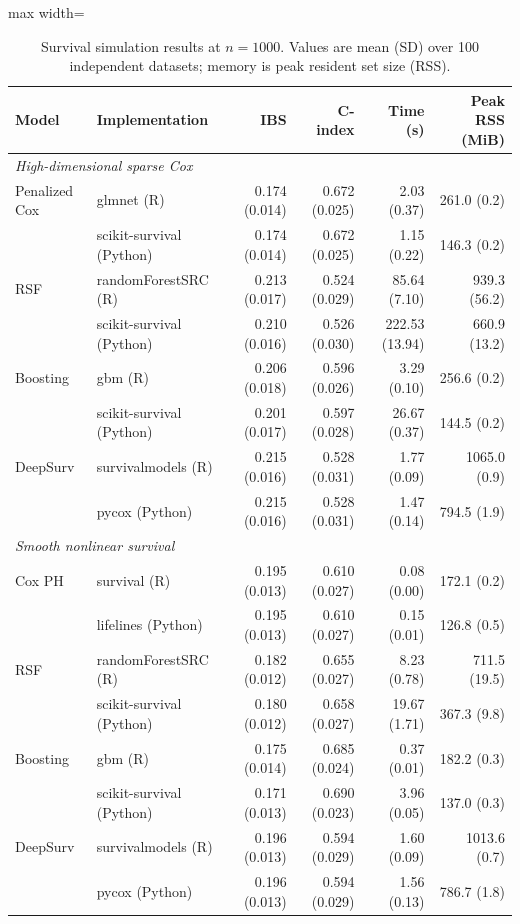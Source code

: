 \begin{table}[htbp]
\centering
\small
\caption{Survival simulation results at $n=1000$. Values are mean (SD) over 100 independent datasets; memory is peak resident set size (RSS).}
\label{tab:survival_simulation_results_n1000}
\setlength{\tabcolsep}{3pt}
\renewcommand{\arraystretch}{1.1}
\begin{adjustbox}{max width=\linewidth}
\begin{tabular}{llrrrr}
\toprule
Model & Implementation & IBS & C-index & Time (s) & Peak RSS (MiB) \\
\midrule
\multicolumn{6}{l}{\textit{High-dimensional sparse Cox}}\\
Penalized Cox & glmnet (R) & 0.174 (0.014) & 0.672 (0.025) & 2.03 (0.37) & 261.0 (0.2) \\
 & scikit-survival (Python) & 0.174 (0.014) & 0.672 (0.025) & 1.15 (0.22) & 146.3 (0.2) \\
RSF & randomForestSRC (R) & 0.213 (0.017) & 0.524 (0.029) & 85.64 (7.10) & 939.3 (56.2) \\
 & scikit-survival (Python) & 0.210 (0.016) & 0.526 (0.030) & 222.53 (13.94) & 660.9 (13.2) \\
Boosting & gbm (R) & 0.206 (0.018) & 0.596 (0.026) & 3.29 (0.10) & 256.6 (0.2) \\
 & scikit-survival (Python) & 0.201 (0.017) & 0.597 (0.028) & 26.67 (0.37) & 144.5 (0.2) \\
DeepSurv & survivalmodels (R) & 0.215 (0.016) & 0.528 (0.031) & 1.77 (0.09) & 1065.0 (0.9) \\
 & pycox (Python) & 0.215 (0.016) & 0.528 (0.031) & 1.47 (0.14) & 794.5 (1.9) \\
\midrule
\multicolumn{6}{l}{\textit{Smooth nonlinear survival}}\\
Cox PH & survival (R) & 0.195 (0.013) & 0.610 (0.027) & 0.08 (0.00) & 172.1 (0.2) \\
 & lifelines (Python) & 0.195 (0.013) & 0.610 (0.027) & 0.15 (0.01) & 126.8 (0.5) \\
RSF & randomForestSRC (R) & 0.182 (0.012) & 0.655 (0.027) & 8.23 (0.78) & 711.5 (19.5) \\
 & scikit-survival (Python) & 0.180 (0.012) & 0.658 (0.027) & 19.67 (1.71) & 367.3 (9.8) \\
Boosting & gbm (R) & 0.175 (0.014) & 0.685 (0.024) & 0.37 (0.01) & 182.2 (0.3) \\
 & scikit-survival (Python) & 0.171 (0.013) & 0.690 (0.023) & 3.96 (0.05) & 137.0 (0.3) \\
DeepSurv & survivalmodels (R) & 0.196 (0.013) & 0.594 (0.029) & 1.60 (0.09) & 1013.6 (0.7) \\
 & pycox (Python) & 0.196 (0.013) & 0.594 (0.029) & 1.56 (0.13) & 786.7 (1.8) \\
\bottomrule
\end{tabular}
\end{adjustbox}
\end{table}
